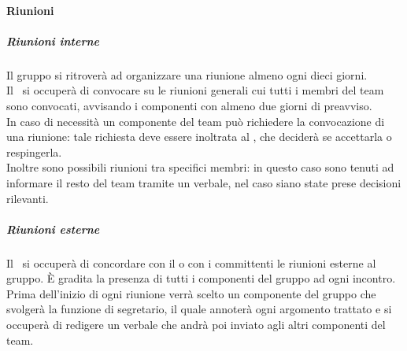 	\paragraph{Riunioni}
	\label{sec:4.1.1.2}
		\subparagraph{Riunioni interne}
		\label{sec:4.1.1.2.1}
			Il gruppo si ritroverà ad organizzare una riunione almeno ogni dieci giorni. \\
			Il \RES \ si occuperà di convocare su  le riunioni generali cui tutti i membri del team sono convocati, avvisando i componenti con almeno due giorni di preavviso. \\
			In caso di necessità un componente del team può richiedere la convocazione di una riunione: tale richiesta deve essere inoltrata al \RES, che deciderà se accettarla o respingerla. \\
			Inoltre sono possibili riunioni tra specifici membri: in questo caso sono tenuti ad informare il resto del team tramite un verbale, nel caso siano state prese decisioni rilevanti. \\
		\subparagraph{Riunioni esterne}
		\label{sec:4.1.1.2.2}
			Il \RES  \ si occuperà di concordare con il  o con i committenti le riunioni esterne al gruppo. È gradita la presenza di tutti i componenti del gruppo ad ogni incontro. \\
			Prima dell'inizio di ogni riunione verrà scelto un componente del gruppo che svolgerà la funzione di segretario, il quale annoterà ogni argomento trattato e si occuperà di redigere un verbale che andrà poi inviato agli altri componenti del team.
